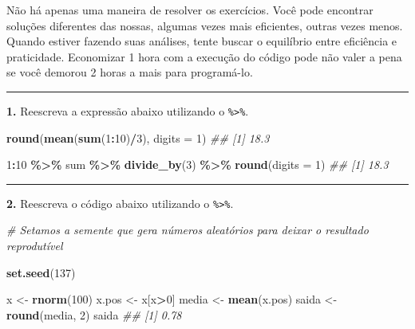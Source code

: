\documentclass[
]{book}
\newenvironment{Shaded}{\begin{snugshade}}{\end{snugshade}}
\newcommand{\CommentTok}[1]{\textcolor[rgb]{0.56,0.35,0.01}{\textit{#1}}}
\newcommand{\DataTypeTok}[1]{\textcolor[rgb]{0.13,0.29,0.53}{#1}}
\newcommand{\DecValTok}[1]{\textcolor[rgb]{0.00,0.00,0.81}{#1}}
\newcommand{\KeywordTok}[1]{\textcolor[rgb]{0.13,0.29,0.53}{\textbf{#1}}}
\newcommand{\NormalTok}[1]{#1}
\newcommand{\OperatorTok}[1]{\textcolor[rgb]{0.81,0.36,0.00}{\textbf{#1}}}
\newcommand{\StringTok}[1]{\textcolor[rgb]{0.31,0.60,0.02}{#1}}
\begin{document}
Não há apenas uma maneira de resolver os exercícios. Você pode encontrar soluções diferentes das nossas, algumas vezes mais eficientes, outras vezes menos. Quando estiver fazendo suas análises, tente buscar o equilíbrio entre eficiência e praticidade. Economizar 1 hora com a execução do código pode não valer a pena se você demorou 2 horas a mais para programá-lo.

\begin{center}\rule{0.5\linewidth}{0.5pt}\end{center}

\textbf{1.} Reescreva a expressão abaixo utilizando o \texttt{\%\textgreater{}\%}.

\begin{Shaded}
\begin{Highlighting}[]
\KeywordTok{round}\NormalTok{(}\KeywordTok{mean}\NormalTok{(}\KeywordTok{sum}\NormalTok{(}\DecValTok{1}\OperatorTok{:}\DecValTok{10}\NormalTok{)}\OperatorTok{/}\DecValTok{3}\NormalTok{), }\DataTypeTok{digits =} \DecValTok{1}\NormalTok{)}
\CommentTok{\#\# [1] 18.3}

\DecValTok{1}\OperatorTok{:}\DecValTok{10} \OperatorTok{\%>\%}
\StringTok{  }\NormalTok{sum }\OperatorTok{\%>\%}
\StringTok{  }\KeywordTok{divide\_by}\NormalTok{(}\DecValTok{3}\NormalTok{) }\OperatorTok{\%>\%}
\StringTok{  }\KeywordTok{round}\NormalTok{(}\DataTypeTok{digits =} \DecValTok{1}\NormalTok{)}
\CommentTok{\#\# [1] 18.3}
\end{Highlighting}
\end{Shaded}

\begin{center}\rule{0.5\linewidth}{0.5pt}\end{center}

\textbf{2.} Reescreva o código abaixo utilizando o \texttt{\%\textgreater{}\%}.

\begin{Shaded}
\begin{Highlighting}[]
\CommentTok{\# Setamos a semente que gera números aleatórios para deixar o resultado reprodutível}

\KeywordTok{set.seed}\NormalTok{(}\DecValTok{137}\NormalTok{)}

\NormalTok{x <{-}}\StringTok{ }\KeywordTok{rnorm}\NormalTok{(}\DecValTok{100}\NormalTok{)}
\NormalTok{x.pos <{-}}\StringTok{ }\NormalTok{x[x}\OperatorTok{>}\DecValTok{0}\NormalTok{]}
\NormalTok{media <{-}}\StringTok{ }\KeywordTok{mean}\NormalTok{(x.pos)}
\NormalTok{saida <{-}}\StringTok{ }\KeywordTok{round}\NormalTok{(media, }\DecValTok{2}\NormalTok{)}
\NormalTok{saida}
\CommentTok{\#\# [1] 0.78}
\end{Highlighting}
\end{Shaded}
\end{document}
